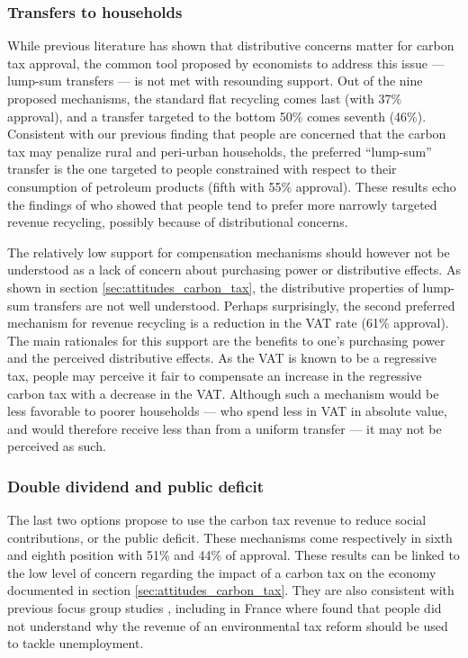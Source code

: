 \documentclass[english,5p,authoryear]{elsarticle}
\begin{document}
        \subsubsection{Transfers to households}
%
While previous literature has shown that distributive concerns matter for carbon tax approval, the common tool proposed by economists to address this issue --- lump-sum transfers --- is not met with resounding support. Out of the nine proposed mechanisms, the standard flat recycling comes last (with 37\% approval), and a transfer targeted to the bottom 50\% comes seventh (46\%). Consistent with our previous finding that people are concerned that the carbon tax may penalize rural and peri-urban households, the preferred ``lump-sum'' transfer is the one targeted to people constrained with respect to their consumption of petroleum products (fifth with 55\% approval). These results echo the findings of \citet{kallbekken_et_al_2011} who showed that people tend to prefer more narrowly targeted revenue recycling, possibly because of distributional concerns. %

The relatively low support for compensation mechanisms should however not be understood as a lack of concern about purchasing power or distributive effects. As shown in section \ref{sec:attitudes_carbon_tax}, the distributive properties of lump-sum transfers are not well understood. Perhaps surprisingly, the second preferred mechanism for revenue recycling is a reduction in the VAT rate (61\% approval). The main rationales for this support are the benefits to one's purchasing power and the perceived distributive effects. As the VAT is known to be a regressive tax, people may perceive it fair to compensate an increase in the regressive carbon tax with a decrease in the VAT. Although such a mechanism would be less favorable to poorer households --- who spend less in VAT in absolute value, and would therefore receive less than from a uniform transfer --- it may not be perceived as such. %

%

        \subsubsection{Double dividend and public deficit}

The last two options propose to use the carbon tax revenue to reduce social contributions, or the public deficit. These mechanisms come respectively in sixth and eighth position with 51\% and 44\% of approval. These results can be linked to the low level of concern regarding the impact of a carbon tax on the economy documented in section \ref{sec:attitudes_carbon_tax}. They are also consistent with previous focus group studies \citep[e.g.][]{kallbekken_aasen_2010}, including in France where \citet{deroubaix_rise_2006} found that people did not understand why the revenue of an environmental tax reform should be used to tackle unemployment.
\end{document}
